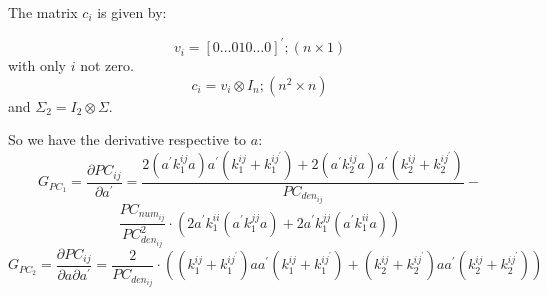 \documentclass[a4paper,10pt]{article}
\begin{document}
The matrix $c_i$ is given by:

\begin{equation}
v_{i} = [0 \dots 0 1 0 \dots 0]^{'}; (n \times 1)
\end{equation}
with only $i$ not zero.
\begin{equation}
c_{i} = v_{i} \otimes I_{n}; (n^{2} \times n)
\end{equation}
and $\Sigma_{2} = I_{2} \otimes \Sigma$.

So we have the derivative respective to $a$:
\begin{equation}
G_{PC_1} = \frac{\partial PC_{ij}}{\partial a^{'}} = \frac{2 (a^{'} k_{1}^{ij} a) a^{'} (k_{1}^{ij} + k_{1}^{ij^{'}}) + 2 (a^{'} k_{2}^{ij} a) a^{'} (k_{2}^{ij} + k_{2}^{ij^{'}}) } 
{PC_{den_{ij}}} -
\end{equation}
\begin{equation}
\frac{PC_{num_{ij}}}{PC_{den_{ij}}^{2}} \cdot (2 a^{'} k_{1}^{ii} (a^{'} k_{1}^{jj} a) + 2 a^{'} k_{1}^{jj} ( a^{'} k_{1}^{ii} a))
\end{equation}
\begin{equation}
G_{PC_2} = \frac{\partial PC_{ij}}{\partial a \partial a^{'}} = \frac{2}{PC_{den_{ij}}} \cdot ((k_{1}^{ij} + k_{1}^{ij^{'}}) a a^{'} (k_{1}^{ij} + k_{1}^{ij^{'}}) + (k_{2}^{ij} + k_{2}^{ij^{'}}) a a^{'} (k_{2}^{ij} + k_{2}^{ij^{'}}))
\end{equation}
\end{document}
